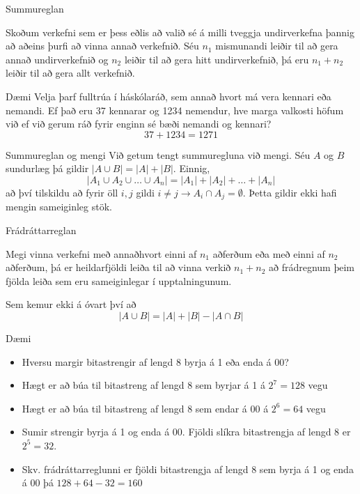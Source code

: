 \documentclass{beamer}
\begin{document}
\begin{frame}{Summureglan}
\begin{tcolorbox}[title=Summureglan]
Skoðum verkefni sem er þess eðlis að valið sé á milli tveggja undirverkefna þannig að aðeins þurfi að vinna annað verkefnið. Séu $n_1$ mismunandi leiðir til að gera annað undirverkefnið og $n_2$ leiðir til að gera hitt undirverkefnið, þá eru $n_1 + n_2$ leiðir til að gera allt verkefnið.
\end{tcolorbox}
\end{frame}

\begin{frame}{Dæmi}
Velja þarf fulltrúa í háskólaráð, sem annað hvort má vera kennari eða nemandi. Ef það eru 37 kennarar og 1234 nemendur, hve marga valkosti höfum við ef við gerum ráð fyrir enginn sé bæði nemandi og kennari?
\pause
\[
 37+1234 = 1271
\]
\end{frame}

\begin{frame}{Summureglan og mengi}
Við getum tengt summuregluna við mengi. Séu $A$ og $B$ sundurlæg þá gildir $|A \cup B| = |A| + |B|$. Einnig,
\[
 |A_1 \cup A_2 \cup \ldots \cup A_n| = |A_1| + |A_2| + \ldots + |A_n|
\]
að því tilskildu að fyrir öll $i,j$ gildi $i \neq j \to A_i \cap A_j = \emptyset$. Þetta gildir ekki hafi mengin sameiginleg stök.
\end{frame}

\begin{frame}{Frádráttarreglan}
\begin{tcolorbox}[title=Frádráttarreglan]
Megi vinna verkefni með annaðhvort einni af $n_1$ aðferðum eða með einni af $n_2$ aðferðum, þá er heildarfjöldi leiða til að vinna verkið $n_1 + n_2$ að frádregnum þeim fjölda leiða sem eru sameiginlegar í upptalningunum.
\end{tcolorbox}
Sem kemur ekki á óvart því að
\[
 |A \cup B| = |A| + |B| - |A \cap B|
\]
\end{frame}

\begin{frame}{Dæmi}
    \begin{itemize}
        \item Hversu margir bitastrengir  af lengd 8 byrja á 1 eða enda á 00?        
        \pause
        \item Hægt er að búa til bitastreng af lengd 8 sem byrjar á 1 á $2^7=128$ vegu    
        \pause
        \item Hægt er að búa til bitastreng af lengd 8 sem endar á 00 á $2^6=64$ vegu    
        \pause     
        \item Sumir strengir byrja á 1 og enda á 00. Fjöldi slíkra bitastrengja af lengd 8 er $2^5=32$.    
        \pause    
        \item Skv. frádráttarreglunni er fjöldi bitastrengja af lengd 8 sem byrja á 1 og enda á 00 þá $128+64-32=160$
    \end{itemize}
\end{frame}
\end{document}
